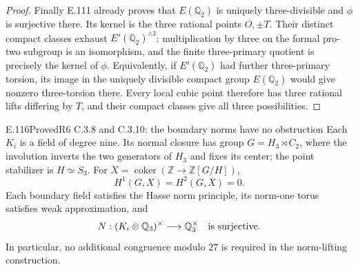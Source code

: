 \begin{proof}
Finally E.111 already proves that $E(\mathbb Q_2)$ is uniquely
three-divisible and $\phi$ is surjective there. Its kernel is the
three rational points $O,\pm T$. Their distinct compact classes
exhaust $E'(\mathbb Q_2)^{\wedge3}$: multiplication by three on the
formal pro-two subgroup is an isomorphism, and the finite
three-primary quotient is precisely the kernel of $\phi$.
Equivalently, if $E'(\mathbb Q_2)$ had further three-primary
torsion, its image in the uniquely divisible compact group
$E(\mathbb Q_2)$ would give nonzero three-torsion there.
Every local cubic point therefore has three rational lifts differing
by $T$, and their compact classes give all three possibilities.
\end{proof}

\begin{result}{E.116}{Proved}{R6 C.3.8 and C.3.10: the boundary norms have no obstruction}
Each $K_i$ is a field of degree nine. Its normal closure has group
$G=H_3\rtimes C_2$, where the involution inverts the two generators
of $H_3$ and fixes its center; the point stabilizer is $H\simeq S_3$.
For $X=\operatorname{coker}(\mathbb Z\to\mathbb Z[G/H])$,
\[
 H^1(G,X)=H^2(G,X)=0.
\]
Each boundary field satisfies the Hasse norm principle, its norm-one
torus satisfies weak approximation, and
\[
 N:(K_i\otimes\mathbb Q_3)^\times\longrightarrow\mathbb Q_3^\times
 \quad\hbox{is surjective}.
\]
In particular, no additional congruence modulo $27$ is required in
the norm-lifting construction.
\end{result}
